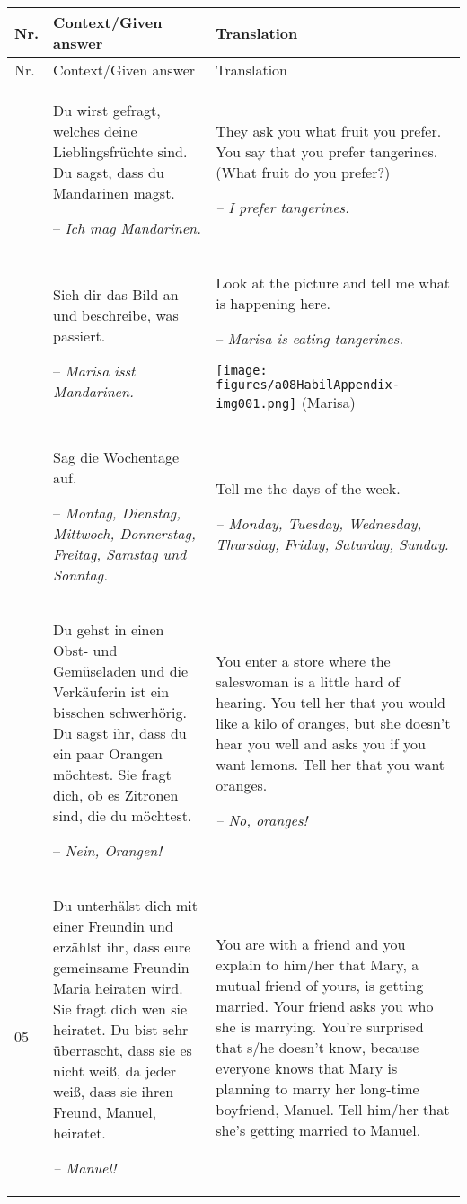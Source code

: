 \begin{xltabular}{\textwidth}{lQQ}

\lsptoprule
Nr. & Context\slash Given answer & Translation\\
\midrule
\endfirsthead
    \midrule
Nr. & Context\slash Given answer & Translation\\
		\midrule\endhead
    \endfoot
    \lspbottomrule
     & Du wirst gefragt, welches deine Lieblingsfrüchte sind. Du sagst, dass du Mandarinen magst.

-- \textit{Ich mag Mandarinen.} & They ask you what fruit you prefer. You say that you prefer tangerines. (What fruit do you prefer?)

{\itshape -- I prefer tangerines.}\\
 & Sieh dir das Bild an und beschreibe, was passiert.

-- \textit{Marisa isst Mandarinen.} & Look at the picture and tell me what is happening here.

-- \textit{Marisa is eating tangerines.}

\texttt{[image: figures/a08HabilAppendix-img001.png]}
 (Marisa)\\
 & Sag die Wochentage auf.

-- \textit{Montag, Dienstag, Mittwoch, Donnerstag, Freitag, Samstag und Sonntag.} & Tell me the days of the week.

{\itshape -- Monday, Tuesday, Wednesday, Thursday, Friday, Saturday, Sunday.}\\
 & Du gehst in einen Obst- und Gemüseladen und die Verkäuferin ist ein bisschen schwerhörig. Du sagst ihr, dass du ein paar Orangen möchtest. Sie fragt dich, ob es Zitronen sind, die du möchtest.

-- \textit{Nein, Orangen!} & You enter a store where the saleswoman is a little hard of hearing. You tell her that you would like a kilo of oranges, but she doesn’t hear you well and asks you if you want lemons. Tell her that you want oranges.

{\itshape -- No, oranges!}\\
05 & Du unterhälst dich mit einer Freundin und erzählst ihr, dass eure gemeinsame Freundin Maria heiraten wird. Sie fragt dich wen sie heiratet. Du bist sehr überrascht, dass sie es nicht weiß, da jeder weiß, dass sie ihren Freund, Manuel, heiratet.

\textit{-- Manuel!} & You are with a friend and you explain to him/her that Mary, a mutual friend of yours, is getting married. Your friend asks you who she is marrying. You're surprised that s/he doesn’t know, because everyone knows that Mary is planning to marry her long-time boyfriend, Manuel. Tell him/her that she’s getting married to Manuel.


\end{xltabular}
